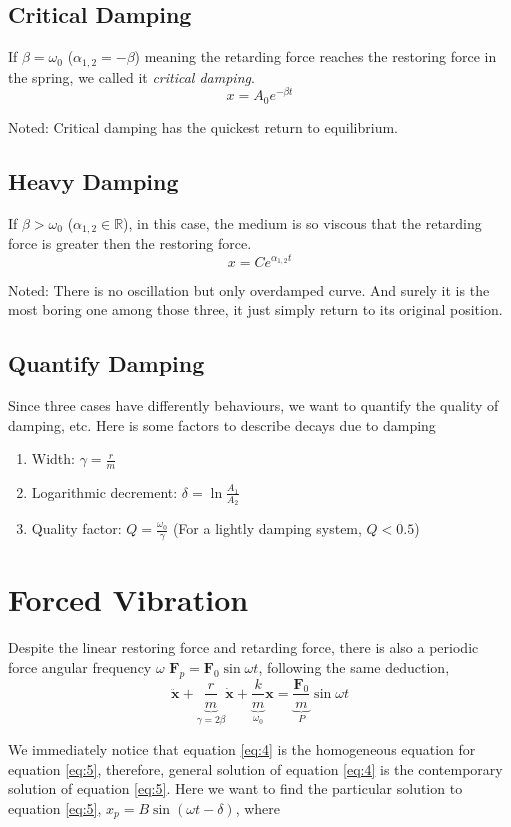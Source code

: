 \documentclass[UTF8]{book}
\begin{document}
\subsection{Critical Damping}
If $\beta =\omega _0$ ($\alpha _{1,2}=-\beta $) meaning the retarding force reaches the restoring force in the spring, we called it \emph{critical damping}. 
\[x=A_0e^{-\beta t}\]

Noted: Critical damping has the quickest return to equilibrium.
\subsection{Heavy Damping}
If $\beta >\omega _0$ ($\alpha _{1,2}\in \mathbb{R}$), in this case, the medium is so viscous that the retarding force is greater then the restoring force.
\[x=Ce^{\alpha _{1,2}t}\]

Noted: There is no oscillation but only overdamped curve. And surely it is the most boring one among those three, it just simply return to its original position.
\subsection{Quantify Damping}
Since three cases have differently behaviours, we want to quantify the quality of damping, etc. Here is some factors to describe decays due to damping
\begin{enumerate}
\item Width: $\gamma =\frac{r}{m}$
\item Logarithmic decrement: $\delta =\ln \frac{A_1}{A_2}$
\item Quality factor: $Q=\frac{\omega _0}{\gamma}$ (For a lightly damping system, $Q<0.5$)
\end{enumerate}

\section{Forced Vibration}
Despite the linear restoring force and retarding force, there is also a periodic force 
angular frequency $\omega $ $\mathbf{F}_p=\mathbf{F}_0\sin \omega t$, following the same deduction,
\begin{equation}\label{eq:5}
\ddot{\mathbf{x}}+\underbrace{\frac{r}{m}}_{\gamma =2\beta}\dot{\mathbf{x}}+\underbrace{\frac{k}{m}}_{\omega _0}\mathbf{x}=\underbrace{\frac{\mathbf{F}_0}{m}}_{P}\sin \omega t
\end{equation}

We immediately notice that equation \eqref{eq:4} is the homogeneous equation for equation \eqref{eq:5}, therefore, general solution of equation \eqref{eq:4} is the contemporary solution of equation \eqref{eq:5}. Here we want to find the particular solution to equation \eqref{eq:5}, $x_p=B\sin (\omega t-\delta )$, where 
\end{document}
